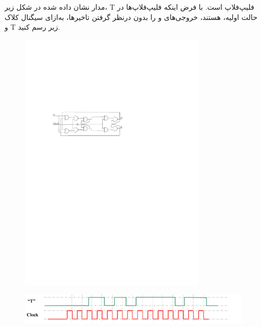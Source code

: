 
مدار نشان داده شده در شکل زیر، T فلیپ‌فلاپ  است. با فرض اینکه فلیپ‌فلاپ‌ها در حالت اولیه،  هستند، خروجی‌های  و  را بدون درنظر گرفتن تاخیر‌ها، به‌ازای سیگنال کلاک و T زیر رسم کنید. \newpage


\begin{figure}[h]
	\centering
	\includegraphics[width=0.8\textwidth]{fig/Q_opt2.pdf}
	\label{fig:Q_opt_2}
\end{figure}

\begin{figure}[h]
	\centering
	\includegraphics[width=1\textwidth]{fig/Q_opt2_2.png}
	\label{fig:Q_opt_2_2}
\end{figure}








%
